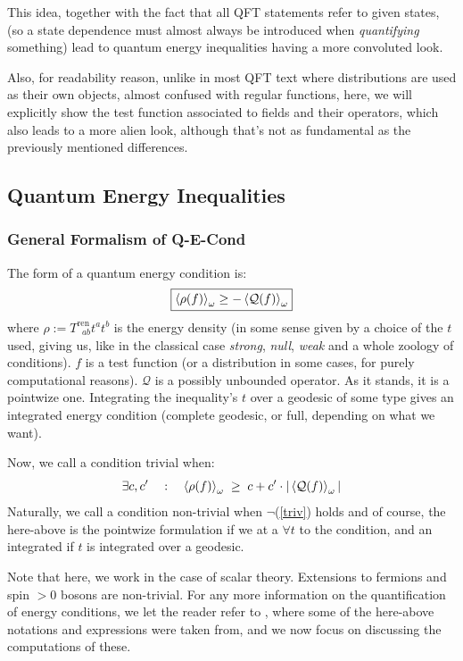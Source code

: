 \documentclass[a4paper,11pt]{article}
\numberwithin{equation}{section}
\theoremstyle{definition}
\begin{document}
This idea, together with the fact that all QFT statements refer to given states, (so a state dependence must almost always be introduced when \emph{quantifying} something) lead to quantum energy inequalities having a more convoluted look.

Also, for readability reason, unlike in most QFT text where distributions are used as their own objects, almost confused with regular functions, here, we will explicitly show the test function associated to fields and their operators, which also leads to a more alien look, although that's not as fundamental as the previously mentioned differences.
\subsection{Quantum Energy Inequalities}
\subsubsection{General Formalism of Q-E-Cond}
The form of a quantum energy condition is:
\begin{equation}
\boxed{\braket{\rho(f)}_\omega \geq - \braket{\mathcal{Q}(f)}_\omega}
\end{equation}
where $\rho:=T^\mathrm{ren}_{\;\;ab}t^at^b$ is the energy density (in some sense given by a choice of the $t$ used, giving us, like in the classical case \emph{strong}, \emph{null}, \emph{weak} and a whole zoology of conditions). $f$ is a test function (or a distribution in some cases, for purely computational reasons). $\mathcal{Q}$ is a possibly unbounded operator. As it stands, it is a pointwize one. Integrating the inequality's $t$ over a geodesic of some type gives an integrated energy condition (complete geodesic, or full, depending on what we want).

Now, we call a condition trivial when:
\begin{equation} \label{triv}
    \exists c, c' \quad : \quad \braket{\rho(f)}_\omega \; \geq \; c + c'\cdot|\braket{\mathcal{Q}(f)}_\omega|
\end{equation}
Naturally, we call a condition non-trivial when $\lnot$(\ref{triv}) holds and of course, the here-above is the pointwize formulation if we at a $\forall t$ to the condition, and an integrated if $t$ is integrated over a geodesic.

Note that here, we work in the case of scalar theory. Extensions to fermions and spin $>0$ bosons are non-trivial. For any more information on the quantification of energy conditions, we let the reader refer to \cite{EleRev}, where some of the here-above notations and expressions were taken from, and we now focus on discussing the computations of these.
\end{document}
